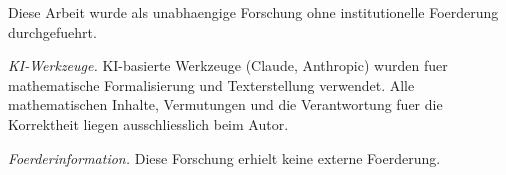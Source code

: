 \documentclass[aps,prd,twocolumn,superscriptaddress,nofootinbib]{revtex4-2}
\theoremstyle{definition}
\theoremstyle{remark}
\begin{document}
\begin{acknowledgments}
Diese Arbeit wurde als unabhaengige Forschung ohne institutionelle Foerderung durchgefuehrt.

\textit{KI-Werkzeuge.} KI-basierte Werkzeuge (Claude, Anthropic) wurden fuer mathematische Formalisierung und Texterstellung verwendet. Alle mathematischen Inhalte, Vermutungen und die Verantwortung fuer die Korrektheit liegen ausschliesslich beim Autor.

\textit{Foerderinformation.} Diese Forschung erhielt keine externe Foerderung.
\end{acknowledgments}


\end{document}

